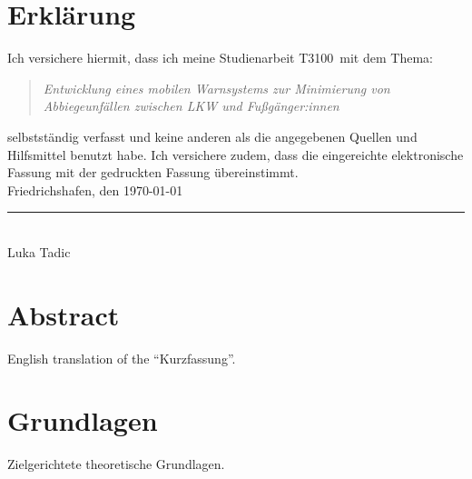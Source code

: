 \documentclass[a4paper, 12pt]{article} %
\newcommand{\titel}{Entwicklung eines mobilen Warnsystems zur Minimierung von Abbiegeunfällen zwischen LKW und Fußgänger:innen}
\newcommand{\arbeit}{Studienarbeit T3100}
\newcommand{\autor}{Luka Tadic}
\begin{document}
\clearpage

\pagestyle{scrheadings}  %
\hypersetup{pageanchor=true}

\section*{Erklärung}

Ich versichere hiermit, dass ich meine \arbeit\ mit dem Thema:

\begin{quote}
    \textit{\titel}
\end{quote}

selbstständig verfasst und keine anderen als die angegebenen Quellen und Hilfsmittel benutzt habe.  
Ich versichere zudem, dass die eingereichte elektronische Fassung mit der gedruckten Fassung übereinstimmt.\\[6ex]

Friedrichshafen, den \today \\[1ex]
\rule[-0.2cm]{5cm}{0.5pt} \\  
\autor \\[10ex]

\rmfamily

\clearpage
\section*{Abstract}
English translation of the “Kurzfassung”.

\clearpage

\tableofcontents

\clearpage

\section{Grundlagen}
Zielgerichtete theoretische \cite{VIETH1999842}Grundlagen.

\clearpage
\end{document}
